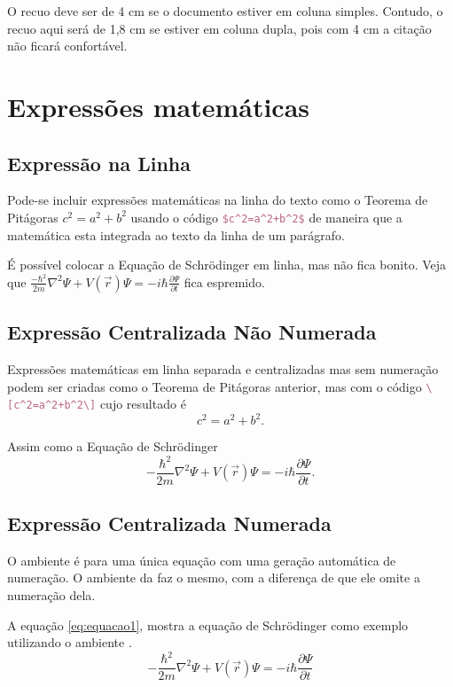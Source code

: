 \documentclass[12pt,a4paper,oneside,linenumbers=off,latinmodern=off,timesnews=off,spanish,english,portuges]{rctart-class/rctart}
\begin{document}
O recuo deve ser de 4 cm se o documento estiver em coluna simples. Contudo, o recuo aqui será de 1,8 cm se estiver em coluna dupla, pois com 4 cm a citação não ficará confortável.

\section{Expressões matemáticas}

\subsection{Expressão na Linha}

Pode-se incluir expressões matemáticas na linha do texto como o Teorema de Pitágoras $c^2=a^2+b^2$ usando o código \lstinline[language=TeX]|$c^2=a^2+b^2$|  de maneira que a matemática esta integrada ao texto da linha de um parágrafo. 

É possível colocar a Equação de Schrödinger em linha, mas não fica bonito. Veja que $\frac{-\hbar^2}{2m}\nabla^2\Psi + V\left(\vec{r}\right)\Psi = -i\hbar \frac{\partial\Psi}{\partial t}$ fica espremido.

\subsection{Expressão Centralizada Não Numerada}
Expressões matemáticas em linha separada e centralizadas mas sem numeração podem ser criadas como o Teorema de Pitágoras anterior, mas com o código \lstinline[language=TeX]|\[c^2=a^2+b^2\]| cujo resultado é \[c^2=a^2+b^2.\]

Assim como a Equação de Schrödinger \[-\frac{\hbar^2}{2m}\nabla^2\Psi + V\left(\vec{r}\right)\Psi = -i\hbar \frac{\partial\Psi}{\partial t}.\]

\subsection{Expressão Centralizada Numerada}
    O ambiente  é para uma única equação com uma geração automática de numeração. O ambiente da  faz o mesmo, com a diferença de que ele omite a numeração dela.

    A equação \eqref{eq:equacao1}, mostra a equação de Schrödinger como exemplo utilizando o ambiente . 
        \begin{equation} \label{eq:equacao1}
            -\frac{\hbar^2}{2m}\nabla^2\Psi + V\left(\vec{r}\right)\Psi = -i\hbar \frac{\partial\Psi}{\partial t}
        \end{equation} 
        
\end{document}
